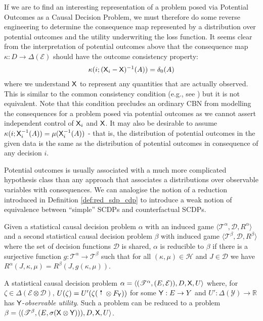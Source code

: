 If we are to find an interesting representation of a problem posed via Potential Outcomes as a Causal Decision Problem, we must therefore do some reverse engineering to determine the consequence map represented by a distribution over potential outcomes and the utility underwriting the loss function. It seems clear from the interpretation of potential outcomes above that the consequence map $\kappa:D\to\Delta(\mathcal{E})$ should have the outcome consistency property:
\begin{align}
    \kappa(i;(\mathsf{X}_i-\mathsf{X})^{-1}(A))=\delta_0(A) \label{eq:oc_consist}
\end{align} 
where we understand $\mathsf{X}$ to represent any quantities that are actually observed. This is similar to the common consistency condition (e.g., see \cite{richardson2013single}) but it is not equivalent. Note that this condition precludes an ordinary CBN from modelling the consequences for a problem posed via potential outcomes as we cannot assert independent control of $\mathsf{X}_i$ and $\mathsf{X}$. It may also be desirable to assume $\kappa(i;\mathsf{X}_i^{-1}(A))=\mu(\mathsf{X}_i^{-1}(A))$ - that is, the distribution of potential outcomes in the given data is the same as the distribution of potential outcomes in consequence of any decision $i$.

Potential outcomes is usually associated with a much more complicated hypothesis class than any approach that associates a distributions over observable variables with consequences. We can analogise the notion of a reduction introduced in Definition \ref{def:red_sdp_cdp} to introduce a weak notion of equivalence between ``simple'' SCDPs and counterfactual SCDPs.

\begin{definition}[Reduction]\label{def:red_scdp}
Given a statistical causal decision problem $\alpha$ with an induced game $\langle \mathscr{T}^\alpha, \mathscr{D}, R^\alpha \rangle$ and a second statistical causal decision problem $\beta$ with induced game $\langle \mathscr{T}^\beta, \mathscr{D}, R^\beta\rangle$ where the set of decision functions $\mathscr{D}$ is shared, $\alpha$ is reducible to $\beta$ if there is a surjective function $g:\mathscr{T}^\alpha\to \mathscr{T}^\beta$ such that for all $(\kappa,\mu)\in \mathscr{H}$ and $J\in \mathscr{D}$ we have $R^\alpha(J,\kappa,\mu)=R^\beta(J,g(\kappa,\mu))$.
\end{definition}

\begin{theorem}\label{th:scdp_obu_red}
A statistical causal decision problem $\alpha=\langle (\mathscr{T}^\alpha,(E,\mathcal{E})),D,\mathsf{X},U\rangle$ where, for $\zeta\in \Delta(\mathcal{E}\otimes\mathcal{D})$, $U(\zeta)=U'(\zeta (\stopper{0.15} \otimes F_{\RV{Y}}))$ for some $\mathsf{Y}:E\to Y$ and $U':\Delta(\mathcal{Y})\to \mathbb{R}$ has $\mathsf{Y}$-\emph{observable utility}. Such a problem can be reduced to a problem $\beta=\langle (\mathscr{T}^\beta,(E,\sigma(\mathsf{X}\otimes\mathsf{Y}))),D,\mathsf{X},U\rangle$.
\end{theorem}

